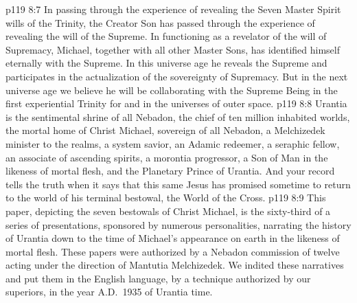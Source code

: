\vs p119 8:7 In passing through the experience of revealing the Seven Master Spirit wills of the Trinity, the Creator Son has passed through the experience of revealing the will of the Supreme. In functioning as a revelator of the will of Supremacy, Michael, together with all other Master Sons, has identified himself eternally with the Supreme. In this universe age he reveals the Supreme and participates in the actualization of the sovereignty of Supremacy. But in the next universe age we believe he will be collaborating with the Supreme Being in the first experiential Trinity for and in the universes of outer space.
\pc \vs p119 8:8 Urantia is the sentimental shrine of all Nebadon, the chief of ten million inhabited worlds, the mortal home of Christ Michael, sovereign of all Nebadon, a Melchizedek minister to the realms, a system savior, an Adamic redeemer, a seraphic fellow, an associate of ascending spirits, a morontia progressor, a Son of Man in the likeness of mortal flesh, and the Planetary Prince of Urantia. And your record tells the truth when it says that this same Jesus has promised sometime to return to the world of his terminal bestowal, the World of the Cross.
\separatorline
\vs p119 8:9 This paper, depicting the seven bestowals of Christ Michael, is the sixty\hyp{}third of a series of presentations, sponsored by numerous personalities, narrating the history of Urantia down to the time of Michael’s appearance on earth in the likeness of mortal flesh. These papers were authorized by a Nebadon commission of twelve acting under the direction of Mantutia Melchizedek. We indited these narratives and put them in the English language, by a technique authorized by our superiors, in the year A.D.~1935 of Urantia time.
